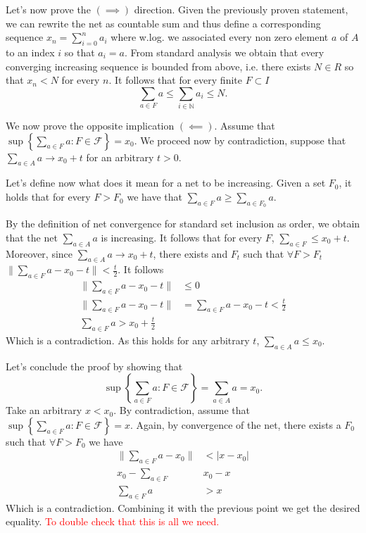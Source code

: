 \documentclass[a4paper,12pt]{article} %
\begin{document}
Let's now prove the \((\implies) \) direction.
Given the previously proven statement, we can rewrite the net as countable sum and thus define a corresponding sequence \(x_n = \sum_{i=0}^n a_{i}  \) where w.log. we associated every non zero element \(a\)  of \(A\) to an index \(i\) so that \(a_i = a\).
From standard analysis we obtain that every converging increasing sequence is bounded from above, i.e. there exists \(N \in  R\) so that \(x_n < N\) for every \(n\).
It follows that for every finite \(F \subset I\)
\begin{equation}
    \sum_{a \in F} a \leq \sum_{i \in  \mathbb{N}}a_i \leq N.
\end{equation}


We now prove the opposite implication \((\impliedby)\). Assume that \(\sup \left\{ \sum_{a \in F} a : F \in \mathcal{F} \right\} = x_0\). We proceed now by contradiction, suppose that \(\sum_{a \in  A}a \to  x_0 +t \) for an arbitrary \(t>0\).


Let's define now what does it mean for a net to be increasing. Given a set \(F_0\), it holds that for every \(F > F_0\) we have that \(\sum_{a\in  F}a \geq  \sum_{a \in  F_0}a  \).

By the definition of net convergence for standard set inclusion as order, we obtain that the net \(\sum_{a\in  A}a \) is increasing.
It follows that for every \(F\), \(\sum_{a \in  F} \leq  x_0 +t \). Moreover, since \(\sum_{a \in  A} a \to x_{0}+t  \), there exists and \(F_t\)  such that \(\forall F > F_t\) \(\| \sum_{a \in  F} a -x_{0}-t   \| < \frac{t}{2} \). It follows
\begin{align*}
    \| \sum_{a \in  F} a -x_0 -t  \| & \leq 0                                   \\
    \| \sum_{a \in  F} a -x_0 -t  \| & =  \sum_{a \in  F} a -x_0 -t<\frac{t}{2} \\
    \sum_{a \in  F}a > x_0 +\frac{t}{2}
\end{align*}
Which is a contradiction. As this holds for any arbitrary \(t\), \(\sum_{a\in A}a \leq x_0 \).


Let's conclude the proof by showing that
\begin{equation}
    \sup \left\{ \sum_{a \in F} a : F \in \mathcal{F} \right\} = \sum_{a \in  A} a = x_0.
\end{equation}
Take an arbitrary \(x<x_0\). By contradiction, assume that \(\sup \left\{ \sum_{a \in F} a : F \in \mathcal{F} \right\} = x\).
Again, by convergence of the net, there exists a \(F_0\) such that \(\forall F>F_0\) we have
\begin{align*}
    \| \sum_{a \in F}a -x_0  \| & <|x-x_0| \\
    x_0 - \sum_{a \in  F}       & x_{0}-x  \\
    \sum_{a \in  F}a            & >x
\end{align*}
Which is a contradiction. Combining it with the previous point we get the desired equality.
\textcolor{red}{To double check that this is all we need.}
\end{document}
